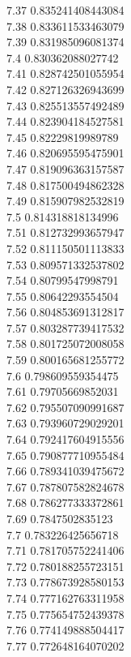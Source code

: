 {7.37	0.835241408443084\\
7.38	0.833611533463079\\
7.39	0.831985096081374\\
7.4	0.830362088027742\\
7.41	0.828742501055954\\
7.42	0.827126326943699\\
7.43	0.825513557492489\\
7.44	0.823904184527581\\
7.45	0.82229819989789\\
7.46	0.820695595475901\\
7.47	0.819096363157587\\
7.48	0.817500494862328\\
7.49	0.815907982532819\\
7.5	0.814318818134996\\
7.51	0.812732993657947\\
7.52	0.811150501113833\\
7.53	0.809571332537802\\
7.54	0.80799547998791\\
7.55	0.80642293554504\\
7.56	0.804853691312817\\
7.57	0.803287739417532\\
7.58	0.801725072008058\\
7.59	0.800165681255772\\
7.6	0.798609559354475\\
7.61	0.79705669852031\\
7.62	0.795507090991687\\
7.63	0.793960729029201\\
7.64	0.792417604915556\\
7.65	0.790877710955484\\
7.66	0.789341039475672\\
7.67	0.787807582824678\\
7.68	0.786277333372861\\
7.69	0.7847502835123\\
7.7	0.783226425656718\\
7.71	0.781705752241406\\
7.72	0.780188255723151\\
7.73	0.778673928580153\\
7.74	0.777162763311958\\
7.75	0.775654752439378\\
7.76	0.774149888504417\\
7.77	0.772648164070202\\
}
